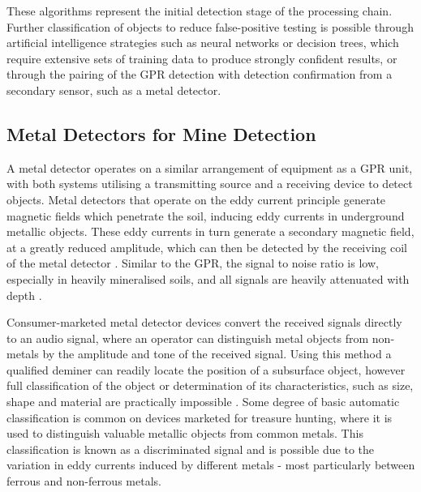 \documentclass[main.tex]{subfiles}
\begin{document}
These algorithms represent the initial detection stage of the processing chain. Further classification of objects to reduce false-positive testing is possible through artificial intelligence strategies such as neural networks or decision trees, which require extensive sets of training data to produce strongly confident results, or through the pairing of the GPR detection with detection confirmation from a secondary sensor, such as a metal detector.

\subsection{Metal Detectors for Mine Detection}
A metal detector operates on a similar arrangement of equipment as a GPR unit, with both systems utilising a transmitting source and a receiving device to detect objects. Metal detectors that operate on the eddy current principle generate magnetic fields which penetrate the soil, inducing eddy currents in underground metallic objects. These eddy currents in turn generate a secondary magnetic field, at a greatly reduced amplitude, which can then be detected by the receiving coil of the metal detector \parencite{Candy2008}. Similar to the GPR, the signal to noise ratio is low, especially in heavily mineralised soils, and all signals are heavily attenuated with depth \parencite{Candy2008}.

Consumer-marketed metal detector devices convert the received signals directly to an audio signal, where an operator can distinguish metal objects from non-metals by the amplitude and tone of the received signal.  Using this method a qualified deminer can readily locate the position of a subsurface object, however full classification of the object or determination of its characteristics, such as size, shape and material are practically impossible \parencite{Kruger2006}. Some degree of basic automatic classification is common on devices marketed for treasure hunting, where it is used to distinguish valuable metallic objects from common metals. This classification is known as a discriminated signal and is possible due to the variation in eddy currents induced by different metals - most particularly between ferrous and non-ferrous metals. 
\end{document}
